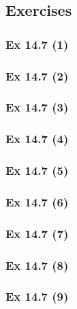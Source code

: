 \subsection*{Exercises}\label{sec:14.7_Exercises}

\subsubsection{Ex 14.7 (1)}\label{sec:Ex_14.7.1}

\subsubsection{Ex 14.7 (2)}\label{sec:Ex_14.7.2}

\subsubsection{Ex 14.7 (3)}\label{sec:Ex_14.7.3}

\subsubsection{Ex 14.7 (4)}\label{sec:Ex_14.7.4}

\subsubsection{Ex 14.7 (5)}\label{sec:Ex_14.7.5}

\subsubsection{Ex 14.7 (6)}\label{sec:Ex_14.7.6}

\subsubsection{Ex 14.7 (7)}\label{sec:Ex_14.7.7}

\subsubsection{Ex 14.7 (8)}\label{sec:Ex_14.7.8}

\subsubsection{Ex 14.7 (9)}\label{sec:Ex_14.7.9}

